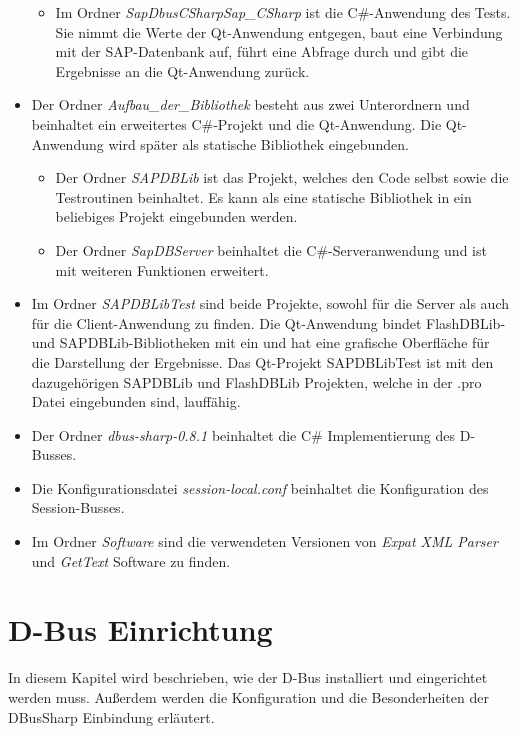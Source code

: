\begin{itemize}
\begin{itemize}
		\item Im Ordner \textit{SapDbusCSharpSap\_CSharp} ist die C\#-Anwendung des Tests. Sie nimmt die Werte der Qt-Anwendung entgegen, baut eine Verbindung mit der SAP-Datenbank auf, führt eine Abfrage durch und gibt die Ergebnisse an die Qt-Anwendung zurück. 
	\end{itemize}
	\item Der Ordner \textit{Aufbau\_der\_Bibliothek} besteht aus zwei Unterordnern und beinhaltet ein erweitertes C\#-Projekt und die Qt-Anwendung. Die Qt-Anwendung wird später als statische Bibliothek eingebunden.
	\begin{itemize}
		\setlength{\itemsep}{-10pt}
		\item Der Ordner \textit{SAPDBLib} ist das Projekt, welches den Code selbst sowie die Testroutinen beinhaltet. Es kann als eine statische Bibliothek in ein beliebiges Projekt eingebunden werden. 
		\item Der Ordner \textit{SapDBServer} beinhaltet die C\#-Serveranwendung und ist mit weiteren Funktionen erweitert. 
	\end{itemize}
	\item Im Ordner \textit{SAPDBLibTest} sind beide Projekte, sowohl für die Server als auch für die Client-Anwendung zu finden. Die Qt-Anwendung bindet FlashDBLib- und SAPDBLib-Bibliotheken mit ein und hat eine grafische Oberfläche für die Darstellung der Ergebnisse. Das Qt-Projekt SAPDBLibTest ist mit den dazugehörigen SAPDBLib und FlashDBLib Projekten, welche in der .pro Datei eingebunden sind, lauffähig.
	\item Der Ordner \textit{dbus-sharp-0.8.1} beinhaltet die C\# Implementierung des D-Busses.
	\item Die Konfigurationsdatei \textit{session-local.conf} beinhaltet die Konfiguration des Session-Busses.
	\item Im Ordner \textit{Software} sind die verwendeten Versionen von \textit{Expat XML Parser} und \textit{GetText} Software zu finden.
\end{itemize}

\section{D-Bus Einrichtung} \label{D-Bus}
In diesem Kapitel wird beschrieben, wie der D-Bus installiert und eingerichtet werden muss. Außerdem werden die Konfiguration und die Besonderheiten der DBusSharp Einbindung erläutert.
